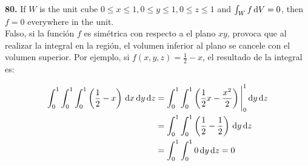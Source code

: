 \documentclass[11pt]{report}
\begin{document}
\textbf{80.} If $W$ is the unit cube $0 \leq x \leq 1, 0 \leq y \leq 1, 0 \leq z \leq 1$
and $ \int _W f \, \text dV = 0$, then $f = 0$ everywhere in the unit. \\

Falso, si la función $f$ es simétrica con respecto a el plano $xy$, provoca que al
realizar la integral en la región, el volumen inferior al plano se cancele con el
volumen superior. Por ejemplo, si $f(x,y,z) = \frac{1}{2} - x$, el resultado
de la integral es:

\begin{equation}
\begin{split}
        \int_0^1 \int_0^1 \int_0^1 \left( \frac{1}{2} - x \right) \, \text dx \, \text dy \, \text dz
        &= \int_0^1 \int_0^1 \left( \frac{1}{2}x - \frac{x^2}{2} \right) \Bigg|_0^1 \, \text dy \, \text dz \\ \notag
        &= \int_0^1 \int_0^1 \left( \frac{1}{2} - \frac{1}{2} \right) \, \text dy \, \text dz \\ \notag
        &= \int_0^1 \int_0^1 0 \, \text dy \, \text dz = 0 \\ \notag
\end{split}
\end{equation}
\end{document}
